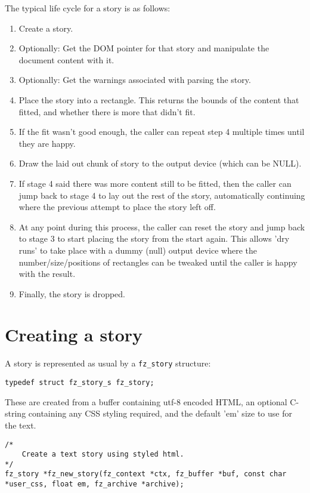 \documentclass[oneside]{book}
\begin{document}
The typical life cycle for a story is as follows:

\begin{enumerate}
\item Create a story.
\item Optionally: Get the DOM pointer for that story and manipulate the document content with it.
\item Optionally: Get the warnings associated with parsing the story.
\item Place the story into a rectangle. This returns the bounds of the content that fitted, and whether there is more that didn't fit.
\item If the fit wasn't good enough, the caller can repeat step 4 multiple times until they are happy.
\item Draw the laid out chunk of story to the output device (which can be NULL).
\item If stage 4 said there was more content still to be fitted, then the caller can jump back to stage 4 to lay out the rest of the story, automatically continuing where the previous attempt to place the story left off.
\item At any point during this process, the caller can reset the story and jump back to stage 3 to start placing the story from the start again. This allows 'dry runs' to take place with a dummy (null) output device where the number/size/positions of rectangles can be tweaked until the caller is happy with the result.
\item Finally, the story is dropped.
\end{enumerate}

\section{Creating a story}

A story is represented as usual by a \texttt{fz\_story} structure:

\begin{lstlisting}
typedef struct fz_story_s fz_story;
\end{lstlisting}

These are created from a buffer containing utf-8 encoded HTML, an optional C-string containing any CSS styling required, and the default 'em' size to use for the text.

\begin{lstlisting}
/*
	Create a text story using styled html.
*/
fz_story *fz_new_story(fz_context *ctx, fz_buffer *buf, const char *user_css, float em, fz_archive *archive);
\end{lstlisting}
\end{document}
